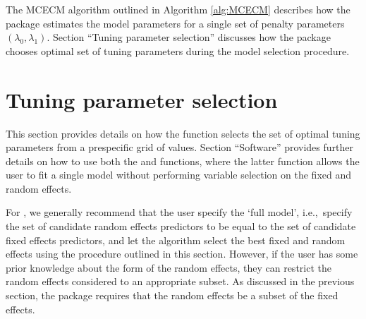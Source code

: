 The MCECM algorithm outlined in Algorithm \ref{alg:MCECM} describes how the 
package estimates the model parameters for a single set of penalty
parameters \((\lambda_0, \lambda_1)\). Section ``Tuning parameter selection''
discusses how the package chooses optimal set of tuning parameters during the model
selection procedure.

\section{Tuning parameter selection}
\label{sec:model-selection}


This section provides details on how the  function selects the set of optimal tuning parameters from a prespecific grid of values. Section ``Software'' provides further details on how to use both the  and  functions, where the latter function allows the user to fit a single model without performing variable selection on the fixed and random effects. 

For , we generally recommend
that the user specify the `full model', i.e.,~specify the set of candidate random effects predictors to be equal to the set of candidate fixed effects predictors,
and let the algorithm select the best fixed and random effects using the procedure outlined in this section. However, if the user has some prior knowledge about the form of the random effects, they can restrict the random effects considered to an appropriate subset. As discussed in the previous section, the package requires that the random effects be a subset of the fixed effects. 

